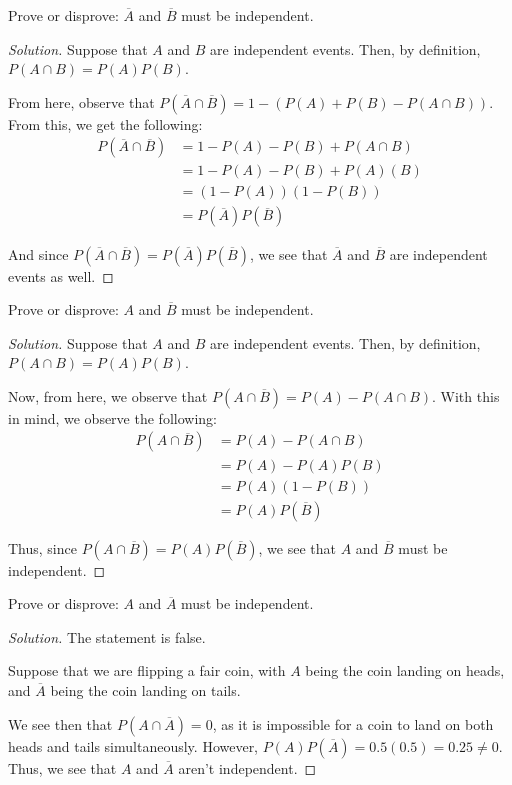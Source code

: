 \documentclass{article}
\newenvironment{solution}{\begin{proof}[Solution]}{\end{proof}}
\begin{document}
\begin{hw}
	Prove or disprove: $\overline{A}$ and $\overline{B}$ must be independent.
\end{hw}
\begin{solution}
	Suppose that $A$ and $B$ are independent events. Then, by definition, $P(A \cap B) = P(A)P(B)$.
	
	From here, observe that $P(\overline{A} \cap \overline{B}) = 1 - (P(A) + P(B) - P(A \cap B))$. From this, we get the following:
	\begin{align*}
		P(\overline{A} \cap \overline{B}) &= 1 - P(A) - P(B) + P(A \cap B) \\
		&= 1 - P(A) - P(B) + P(A)(B) \\
		&= (1-P(A))(1-P(B)) \\
		&= P(\overline{A})P(\overline{B})
	\end{align*}

	And since $P(\overline{A} \cap \overline{B}) = P(\overline{A})P(\overline{B})$, we see that $\overline{A}$ and $\overline{B}$ are independent events as well.
\end{solution}

\begin{hw}
	Prove or disprove: $A$ and $\overline{B}$ must be independent.
\end{hw}
\begin{solution}
	Suppose that $A$ and $B$ are independent events. Then, by definition, $P(A \cap B) = P(A)P(B)$.
	
	Now, from here, we observe that $P(A \cap \overline{B}) = P(A) - P(A \cap B)$. With this in mind, we observe the following:
	\begin{align*}
		P(A \cap \overline{B}) &= P(A) - P(A \cap B) \\
		&= P(A) - P(A)P(B) \\
		&= P(A)(1-P(B)) \\
		&= P(A)P(\overline{B})
	\end{align*}

	Thus, since $P(A \cap \overline{B}) = P(A)P(\overline{B})$, we see that $A$ and $\overline{B}$ must be independent.
\end{solution}

\begin{hw}
	Prove or disprove: $A$ and $\overline{A}$ must be independent.
\end{hw}
\begin{solution}
	The statement is false.
	
	Suppose that we are flipping a fair coin, with $A$ being the coin landing on heads, and $\overline{A}$ being the coin landing on tails. 
	
	We see then that $P(A \cap \overline{A}) = 0$, as it is impossible for a coin to land on both heads and tails simultaneously. However, $P(A)P(\overline{A}) = 0.5(0.5) = 0.25 \not= 0$. Thus, we see that $A$ and $\overline{A}$ aren't independent.
\end{solution}
\end{document}
